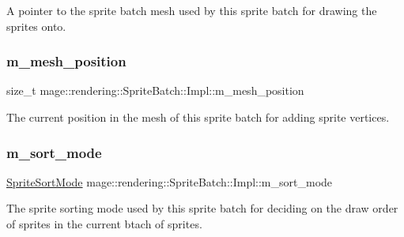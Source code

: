 A pointer to the sprite batch mesh used by this sprite batch for drawing the sprites onto. \hypertarget{classmage_1_1rendering_1_1_sprite_batch_1_1_impl_ab8e03aab794373cafdba47da389044a0}{}\label{classmage_1_1rendering_1_1_sprite_batch_1_1_impl_ab8e03aab794373cafdba47da389044a0} 
\subsubsection{\texorpdfstring{m\+\_\+mesh\+\_\+position}{m\_mesh\_position}}
{\footnotesize\ttfamily size\+\_\+t mage\+::rendering\+::\+Sprite\+Batch\+::\+Impl\+::m\+\_\+mesh\+\_\+position\hspace{0.3cm}{\ttfamily [private]}}

The current position in the mesh of this sprite batch for adding sprite vertices. \hypertarget{classmage_1_1rendering_1_1_sprite_batch_1_1_impl_a98659f29ee7ea1bdcc8c18ac0dfdcf48}{}\label{classmage_1_1rendering_1_1_sprite_batch_1_1_impl_a98659f29ee7ea1bdcc8c18ac0dfdcf48} 
\subsubsection{\texorpdfstring{m\+\_\+sort\+\_\+mode}{m\_sort\_mode}}
{\footnotesize\ttfamily \hyperlink{namespacemage_1_1rendering_a4fad00dbca0c8d854c765ab831c76055}{Sprite\+Sort\+Mode} mage\+::rendering\+::\+Sprite\+Batch\+::\+Impl\+::m\+\_\+sort\+\_\+mode\hspace{0.3cm}{\ttfamily [private]}}

The sprite sorting mode used by this sprite batch for deciding on the draw order of sprites in the current btach of sprites. \hypertarget{classmage_1_1rendering_1_1_sprite_batch_1_1_impl_a1209d58b70713e61bc8f8fc753f9036e}{}\label{classmage_1_1rendering_1_1_sprite_batch_1_1_impl_a1209d58b70713e61bc8f8fc753f9036e} 
